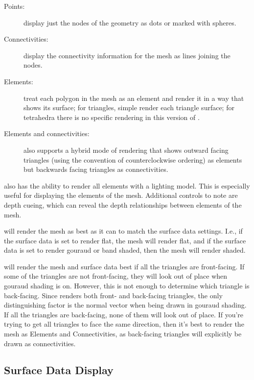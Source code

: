 \begin{description}
  \item [Points: ] display just the nodes of the geometry as dots or marked
        with spheres.
  \item [Connectivities: ] display the connectivity information for the
        mesh as lines joining the nodes.
  \item [Elements: ] treat each polygon in the mesh as an element and
        render it in a way that shows its surface; for triangles, simple
        render each triangle surface; for tetrahedra there is no specific
        rendering in this version of \map{}.
  \item [Elements and connectivities: ] \map{} also supports a hybrid mode
        of rendering that shows outward facing triangles (using the
        convention of counterclockwise ordering) as elements but backwards
        facing triangles as connectivities.
\end{description}

\map{} also has the ability to render
all elements with a lighting model.  This is especially useful for
displaying the elements of the mesh.  Additional controls to note are depth
cueing, which can reveal the depth relationships between elements of the
mesh. 

\map{} will render the mesh as best as it can to match the surface data
settings.  I.e., if the surface data is set to render flat, the mesh will
render flat, and if the surface data is set to render gouraud or band shaded, 
then the mesh will render shaded.

\map{} will render the mesh and surface data best if all the triangles are
front-facing.  If some of the triangles are not front-facing, they will look
out of place when gouraud shading is on.  However, this is not enough to 
determine which triangle is back-facing.  Since \map{} renders both front-
and back-facing triangles, the only distinguishing factor is the normal
vector when being drawn in gouraud shading.  If all the triangles are back-facing,
none of them will look out of place.  If you're trying to get all triangles to face
the same direction, then it's best to render the mesh as Elements and 
Connectivities, as back-facing triangles will explicitly be drawn as connectivities.


\subsection{Surface Data Display} 
\label{sec:display-data} 

